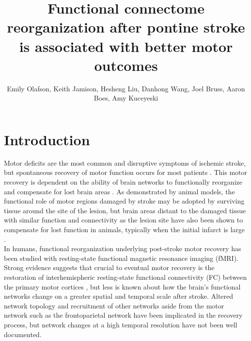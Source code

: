 \documentclass[10pt]{article}
\begin{document}
 
	\sectionfont{\large}
	\title{Functional connectome reorganization after pontine stroke is associated with better motor  	outcomes}
	\maketitle
 	\author{Emily Olafson, Keith Jamison, Hesheng Liu, Danhong Wang, Joel Bruss, Aaron Boes, Amy Kuceyeski}%
	
	\section*{Introduction}
	Motor deficits are the most common and disruptive symptoms of ischemic stroke, but spontaneous recovery of motor function occurs for most patients \cite{Duncan2000-uj}. This motor recovery is dependent on the ability of brain networks to functionally reorganize and compensate for lost brain areas \cite{Corbetta2005-ra}. As demonstrated by animal models, the functional role of motor regions damaged by stroke may be adopted by surviving tissue around the site of the lesion, but brain areas distant to the damaged tissue with similar function and connectivity as the lesion site have also been shown to compensate for lost function in animals, typically when the initial infarct is large \cite{Winship2009-af, Adam2020-jk, Murata2015-ss, Brown2009-jn}.
	\\
	
	In humans, functional reorganization underlying post-stroke motor recovery has been studied with resting-state functional magnetic resonance imaging (fMRI). Strong evidence suggests that crucial to eventual motor recovery is the restoration of interhemispheric resting-state functional connectivity (FC) between the primary motor cortices \cite{Carter2010-er, Urbin2014-iq, Rehme2013-ap}, but less is known about how the brain’s functional networks change on a greater spatial and temporal scale after stroke. Altered network topology \cite{Wang2010-or} and recruitment of other networks aside from the motor network such as the frontoparietal network \cite{Hordacre2021-ct, Pool2018-px} have been implicated in the recovery process, but network changes at a high temporal resolution have not been well documented.
	\\
	
\end{document}
